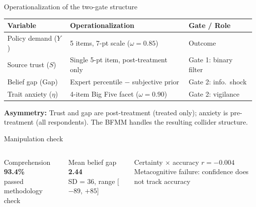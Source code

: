 \documentclass[aspectratio=169,11pt]{beamer}
\begin{document}
\begin{frame}{Operationalization of the two-gate structure}

\begin{table}
\centering
\small
\begin{tabular}{lll}
\toprule
\textbf{Variable} & \textbf{Operationalization} & \textbf{Gate / Role} \\
\midrule
Policy demand ($Y$) & 5 items, 7-pt scale ($\omega = 0.85$) & Outcome \\
Source trust ($S$) & Single 5-pt item, post-treatment only & Gate 1: binary filter \\
Belief gap (Gap) & Expert percentile $-$ subjective prior & Gate 2: info.\ shock \\
Trait anxiety ($\eta$) & 4-item Big Five facet ($\omega = 0.90$) & Gate 2: vigilance \\
\bottomrule
\end{tabular}
\end{table}

\vspace{0.3cm}
{\small \textcolor{sbuamber}{\textbf{Asymmetry:}} Trust and gap are post-treatment (treated only); anxiety is pre-treatment (all respondents). The BFMM handles the resulting collider structure.}

\end{frame}

\begin{frame}{Manipulation check}

\begin{columns}[T]
\begin{block}{Comprehension}
\centering \textbf{\Large 93.4\%} \\
{\small passed methodology check}
\end{block}

\begin{block}{Mean belief gap}
\centering \textbf{\Large 2.44} \\
{\small SD = 36, range [$-89$, $+85$]}
\end{block}

\begin{block}{Certainty $\times$ accuracy}
\centering \textbf{\Large $r = -0.004$} \\
{\small Metacognitive failure: confidence does not track accuracy}
\end{block}
\end{columns}

\end{frame}
\end{document}
